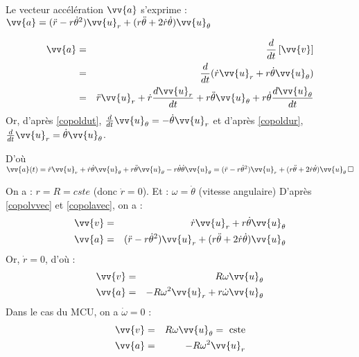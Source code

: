 \newpage

\begin{corollary}\label{copolavec}
    Le vecteur accélération \(\vv{a}\) s'exprime : \(\vv{a} = (\ddot{r}-r\dot{\theta}^2)\vv{u}_r + (r\ddot{\theta}+2\dot{r}\dot{\theta})\vv{u}_\theta\)  
    \begin{explanation}
        \begin{eqnarray*}
            \vv{a} &=& \frac{d}{dt}\left[ \vv{v} \right] \\
            &=&\frac{d}{dt} (\dot{r}\vv{u}_r + r\dot{\theta}\vv{u}_\theta) \\
            &=& \ddot{r} \vv{u}_r + \dot{r}\frac{d\vv{u}_r}{dt} +r\ddot{\theta}\vv{u}_\theta + r\dot{\theta}\frac{d\vv{u}_\theta}{dt}
        \end{eqnarray*}
        Or, d'après \autoref{copoldut}, \(\frac{d}{dt}\vv{u}_{\theta} = -\dot{\theta}\vv{u}_{r}\) et d'après \autoref{copoldur}, \(\frac{d}{dt}\vv{u}_{r} = \dot{\theta } \vv{u}_{\theta }\). \par
        D'où \(\vv{a}(t) = \ddot{r}\vv{u}_r +\dot{r}\dot{\theta}\vv{u}_\theta + r\ddot{\theta}\vv{u}_\theta -r\dot{\theta}\dot{\theta}\vv{u}_\theta = (\ddot{r}-r\dot{\theta}^2)\vv{u}_r + (r\ddot{\theta}+2\dot{r}\dot{\theta})\vv{u}_\theta \,\square\)  
    \end{explanation}
\end{corollary}

\begin{eg}
    On a  : $r = R = cste $ (donc $\dot{r} = 0$). Et :  $\omega = \dot{\theta}$ (vitesse angulaire)
    D'après \autoref{copolvvec} et \autoref{copolavec}, on a : 
    \begin{eqnarray*}
        \vv{v} &=& \dot{r}\vv{u}_{r} + r\dot{\theta }\vv{u}_{\theta }\\
        \vv{a}&=&  (\ddot{r}-r\dot{\theta}^2)\vv{u}_r + (r\ddot{\theta}+2\dot{r}\dot{\theta})\vv{u}_\theta
    \end{eqnarray*}
    Or, \(\dot{r} =  0\), d'où : 
    \begin{eqnarray*}
        \vv{v} &=& R \omega \vv{u}_{\theta }\\
        \vv{a} &=& -R \omega^{2} \vv{u}_{r} + r \dot{\omega}\vv{u}_{\theta}
    \end{eqnarray*}
    Dans le cas du MCU, on a \(\dot{\omega} = 0\) : 
    \begin{eqnarray*}
        \vv{v} &=& R \omega \vv{u}_{\theta } = \text{ cste}\\
        \vv{a} &=& -R \omega^{2} \vv{u}_{r}
    \end{eqnarray*}
\end{eg}

